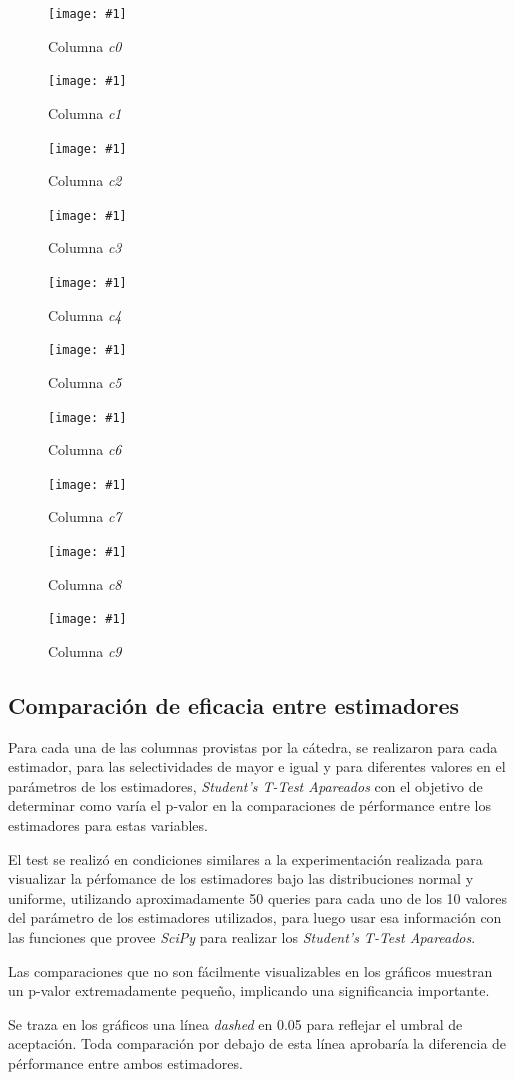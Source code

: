 \documentclass[a4paper, 10pt, twoside]{article}
\newcommand{\grafico}[3]{
  \begin{figure}[H]
    \texttt{[image: \#1]}
    \caption{#2}
    \label{#3}
  \end{figure}
}
\begin{document}
\grafico{dataset-c0}
        {Columna \emph{c0}}
        {dataset-columna-c0}

\grafico{dataset-c1}
        {Columna \emph{c1}}
        {dataset-columna-c1}

\grafico{dataset-c2}
        {Columna \emph{c2}}
        {dataset-columna-c2}

\grafico{dataset-c3}
        {Columna \emph{c3}}
        {dataset-columna-c3}

\grafico{dataset-c4}
        {Columna \emph{c4}}
        {dataset-columna-c4}

\grafico{dataset-c5}
        {Columna \emph{c5}}
        {dataset-columna-c5}

\grafico{dataset-c6}
        {Columna \emph{c6}}
        {dataset-columna-c6}

\grafico{dataset-c7}
        {Columna \emph{c7}}
        {dataset-columna-c7}

\grafico{dataset-c8}
        {Columna \emph{c8}}
        {dataset-columna-c8}

\grafico{dataset-c9}
        {Columna \emph{c9}}
        {dataset-columna-c9}


\subsection{Comparación de eficacia entre estimadores}
Para cada una de las columnas provistas por la cátedra, se realizaron para cada estimador, para las selectividades de mayor e igual y para diferentes valores en el parámetros de los estimadores, \textit{Student’s T-Test Apareados} con el objetivo de determinar como varía el p-valor en la comparaciones de pérformance entre los estimadores para estas variables.

El test se realizó en condiciones similares a la experimentación realizada para visualizar la pérfomance de los estimadores bajo las distribuciones normal y uniforme, utilizando aproximadamente 50 queries para cada uno de los 10 valores del parámetro de los estimadores utilizados, para luego usar esa información con las funciones que provee \textit{SciPy} para realizar los \textit{Student’s T-Test Apareados}.

Las comparaciones que no son fácilmente visualizables en los gráficos muestran un p-valor extremadamente pequeño, implicando una significancia importante.

Se traza en los gráficos una línea \textit{dashed} en 0.05 para reflejar el umbral de aceptación. Toda comparación por debajo de esta línea aprobaría la diferencia de pérformance entre ambos estimadores.
\end{document}
